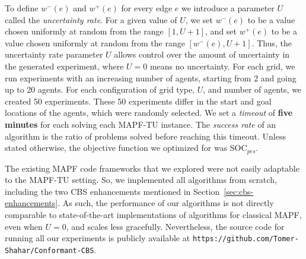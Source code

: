\documentclass[jair,twoside,11pt,theapa]{article}
\newcommand{\timel}{w^-}
\newcommand{\timeu}{w^+}
\newcommand{\mapftu}{MAPF-TU\xspace}
\newcommand{\socpes}{SOC$_{pes}$\xspace}
\begin{document}
To define $\timel(e)$ and $\timeu(e)$ for every edge $e$ we introduce a parameter $U$ called the \emph{uncertainty rate}. For a given value of $U$, we set $\timel(e)$ to be a value chosen uniformly at random from the range $[1,U+1]$, 
and set $\timeu(e)$ to be a value chosen uniformly at random from the range $[\timel(e), U+1]$. 
Thus, the uncertainty rate parameter $U$ allows control over the amount of uncertainty in the generated experiment,  
where $U=0$ means no uncertainty. 
For each grid, we run experiments with an increasing number of agents, starting from 2 and going up to 20 agents. 
For each configuration of grid type, $U$, and number of agents, we created 50 experiments. 
These 50 experiments differ in the start and goal locations of the agents, which were randomly selected. 
We set a \emph{timeout} of \textbf{five minutes} for each solving each \mapftu instance. The \emph{success rate} of an algorithm is the ratio of problems solved before reaching this timeout. Unless stated otherwise, the objective function we optimized for was \socpes. 




The existing MAPF code frameworks that we explored were not easily adaptable to the \mapftu setting.
So, we implemented all algorithms from scratch, including the two CBS enhancements mentioned in Section~\ref{sec:cbs-enhancements}. 
As such, the performance of our algorithms is not directly comparable to state-of-the-art implementations of algorithms for classical MAPF, even when $U=0$, and scales less gracefully. 
Nevertheless, the source code for running all our experiments is publicly available at \texttt{https://github.com/Tomer-Shahar/Conformant-CBS}.













\end{document}
